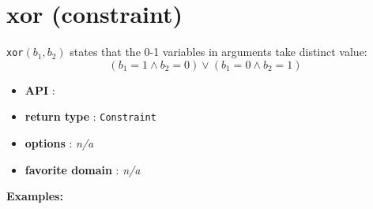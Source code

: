 \label{xor}
\hypertarget{xor}{}

\section{xor (constraint)}\label{xor:xorconstraint}\hypertarget{xor:xorconstraint}{}
\begin{notedef}
    \texttt{xor}$(b_1,b_2)$ states that the 0-1 variables in arguments take distinct value:
$$ (b_1=1 \land b_2=0) \lor (b_1=0 \land b_2=1)$$
\end{notedef}

\begin{itemize}
    \item \textbf{API} : 
	\item \textbf{return type} : \texttt{Constraint}
	\item \textbf{options} : \emph{n/a}
	\item \textbf{favorite domain} : \emph{n/a}
\end{itemize}

\textbf{Examples:}

